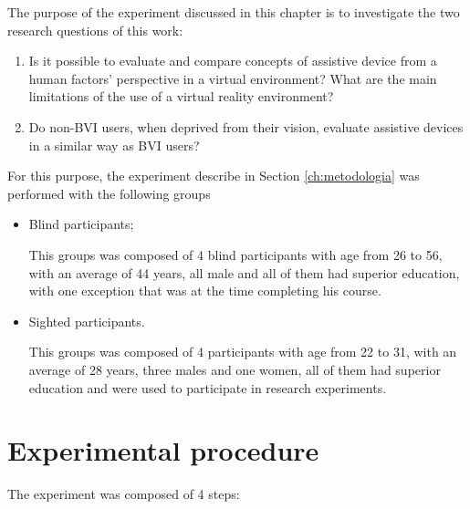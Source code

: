 The purpose of the experiment discussed in this chapter is to investigate the two research questions of this work:

\begin{enumerate}[leftmargin = 2ex, label = $H_\arabic*$:]
    \item Is it possible to evaluate and compare concepts of assistive device from a human factors’ perspective in a virtual environment? What are the main limitations of the use of a virtual reality environment?
    \item Do non-BVI users, when deprived from their vision, evaluate assistive devices in a similar way as BVI users?
\end{enumerate}



For this purpose, the experiment describe in Section \ref{ch:metodologia} was performed with the following groups

\begin{itemize}
    \item Blind participants;

        This groups was composed of 4 blind participants with age from 26 to 56, with an average of 44 years, all male and all of them had superior education, with one exception that was at the time completing his course.

    \item Sighted participants.
    
        This groups was composed of 4 participants with age from 22 to 31, with an average of 28 years, three males and one women, all of them had superior education and were used to participate in research experiments.
\end{itemize}
    


\section{Experimental procedure}
The experiment was composed of 4 steps:

